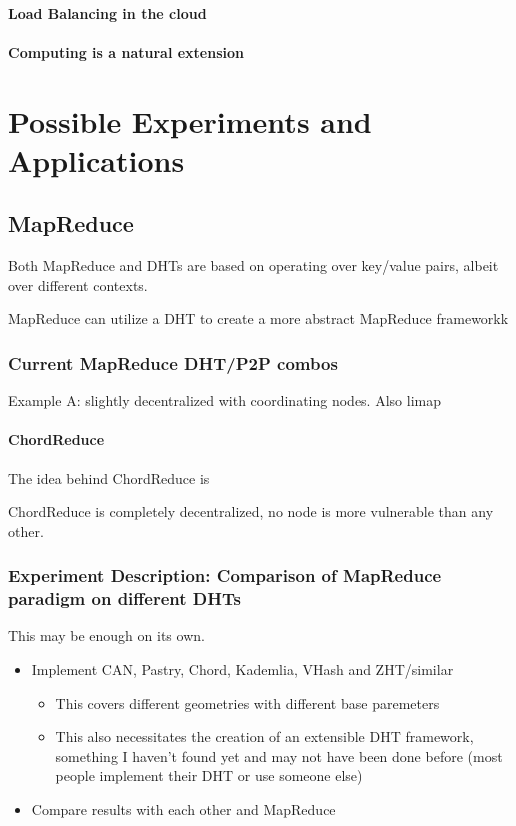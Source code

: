 \documentclass[10pt,letterpaper]{report}
\begin{document}
\subsubsection{Load Balancing in the cloud}
\subsubsection{Computing is a natural extension}

\chapter{Possible Experiments and Applications}




\section{MapReduce}
Both MapReduce \cite{mapreduce} and DHTs are based on operating over key/value pairs, albeit over different contexts.

MapReduce can utilize a DHT to create a more abstract MapReduce frameworkk

\subsection{Current MapReduce DHT/P2P combos}
Example A: slightly decentralized with coordinating nodes.
Also limap


\subsubsection{ChordReduce}
The idea behind ChordReduce is 

ChordReduce is completely decentralized, no node is more vulnerable than any other.


\subsection{Experiment Description: Comparison of MapReduce paradigm on different DHTs}
This may be enough on its own.
\begin{itemize}
	\item Implement CAN, Pastry, Chord, Kademlia, VHash and ZHT/similar
	\begin{itemize}	
		\item This covers different geometries with different base paremeters
		\item This also necessitates the creation of an extensible DHT framework, something I haven't found yet and may not have been done before (most people implement their DHT or use someone else)
	\end{itemize}
	\item Compare results with each other and MapReduce
	
\end{itemize}
\end{document}
